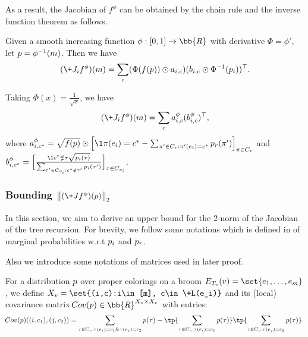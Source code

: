 \documentclass[a4paper,11pt]{article}
\renewcommand{\norm}[1]{\left\|#1\right\|}
\begin{document}
As a result, the Jacobian of $f^\phi$ can be obtained by the chain rule and the inverse function theorem as follows.
\begin{proposition}\label{prop:eq_of_Ji}
Given a smooth increasing function $\phi:[0,1]\rightarrow \bb{R}$ with derivative $\Phi = \phi'$, let $\*p = \phi^{-1}(\*m)$. Then we have
\begin{align*}
    (\+J_i f^{\phi})(\*m)=\sum_c (\Phi(f(\*p))\odot \*a_{i,c})(\*b_{i,c} \odot \Phi^{-1}(\*p_i))^{\top}.
\end{align*}
\end{proposition}
Taking $\Phi(x)=\frac{1}{\sqrt{x}}$, we have
\begin{align*}
    (\+J_i f^{\phi})(\*m)=\sum_c \*a^{\phi}_{i,c} (\*b^{\phi}_{i,c})^{\top},
\end{align*}
where $\*a^{\phi}_{i,c^*}=\sqrt{f(\*p)}\odot \Big[\1{\pi(e_i)=c^*}-\sum_{\pi' \in C_{r} : \pi'(e_i)=c^*}\*p_r(\pi')\Big]_{\pi\in C_r}$ and $\*b^{\phi}_{i,c^*}=\Big[\frac{\1{c^*\notin \tau}\sqrt{\*p_i(\tau)}}{\sum_{\tau' \in C_{v_i}: c^*\notin \tau'}\*p_i(\tau')}\Big]_{\tau\in C_{v_i}}$.

\subsubsection{Bounding $\norm{(\+J f^{\phi})(\*p)}_2$}

In this section, we aim to derive an upper bound for the 2-norm of the Jacobian of the tree recursion.
For brevity, we follow some notations which is defined in  of marginal probabilities w.r.t $\*p_i$ and $\*p_r$.


Also we introduce some notations of matrices used in later proof.
\begin{definition}\label{def:covariance}
    For a distribution $\*p$ over proper colorings on a broom $E_{T_v}(v)=\set{e_1,\dots,e_m}$, we define $X_v=\set{(i,c):i\in [m], c\in \+L(e_i)}$ and its (local) covariance matrix $ \!{Cov}(\*p)\in \bb{R}^{X_v\times X_v}$ with entries:
    $$ \!{Cov}(\*p)((i,c_1),(j,c_2)) = \sum_{\tau \in C_v:\tau(e_i)=c_1 \& \tau(e_j)=c_2} \*p(\tau)-\tp{\sum_{\tau \in C_v:\tau(e_i)=c_1}\*p(\tau)}\tp{\sum_{\tau \in C_v:\tau(e_j)=c_2}\*p(\tau)}.$$
\end{definition}
\end{document}
